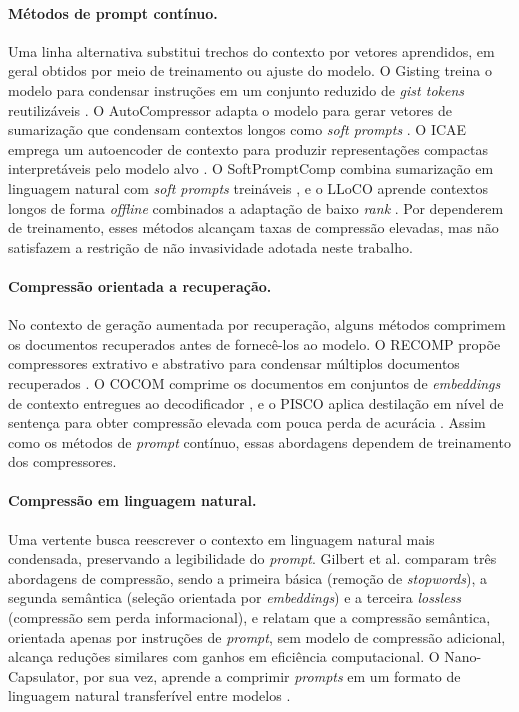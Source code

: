 \paragraph{Métodos de prompt contínuo.}
Uma linha alternativa substitui trechos do contexto por vetores aprendidos, em geral obtidos por meio de treinamento ou ajuste do modelo. O Gisting treina o modelo para condensar instruções em um conjunto reduzido de \textit{gist tokens} reutilizáveis \cite{mu2023gist}. O AutoCompressor adapta o modelo para gerar vetores de sumarização que condensam contextos longos como \textit{soft prompts} \cite{chevalier2023autocompressor}. O ICAE emprega um autoencoder de contexto para produzir representações compactas interpretáveis pelo modelo alvo \cite{ge2023icae}. O SoftPromptComp combina sumarização em linguagem natural com \textit{soft prompts} treináveis \cite{wang2024softpromptcomp}, e o LLoCO aprende contextos longos de forma \textit{offline} combinados a adaptação de baixo \textit{rank} \cite{tan2024lloco}. Por dependerem de treinamento, esses métodos alcançam taxas de compressão elevadas, mas não satisfazem a restrição de não invasividade adotada neste trabalho.

\paragraph{Compressão orientada a recuperação.}
No contexto de geração aumentada por recuperação, alguns métodos comprimem os documentos recuperados antes de fornecê-los ao modelo. O RECOMP propõe compressores extrativo e abstrativo para condensar múltiplos documentos recuperados \cite{xu2023recomp}. O COCOM comprime os documentos em conjuntos de \textit{embeddings} de contexto entregues ao decodificador \cite{rau2024cocom}, e o PISCO aplica destilação em nível de sentença para obter compressão elevada com pouca perda de acurácia \cite{louis2025pisco}. Assim como os métodos de \textit{prompt} contínuo, essas abordagens dependem de treinamento dos compressores.

\paragraph{Compressão em linguagem natural.}
Uma vertente busca reescrever o contexto em linguagem natural mais condensada, preservando a legibilidade do \textit{prompt}. Gilbert et al. \cite{gilbert2023semanticcompression} comparam três abordagens de compressão, sendo a primeira básica (remoção de \textit{stopwords}), a segunda semântica (seleção orientada por \textit{embeddings}) e a terceira \textit{lossless} (compressão sem perda informacional), e relatam que a compressão semântica, orientada apenas por instruções de \textit{prompt}, sem modelo de compressão adicional, alcança reduções similares com ganhos em eficiência computacional. O Nano-Capsulator, por sua vez, aprende a comprimir \textit{prompts} em um formato de linguagem natural transferível entre modelos \cite{chuang2024nanocapsulator}.

